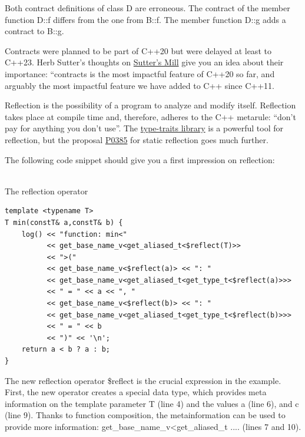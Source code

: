 Both contract definitions of class D are erroneous. The contract of the member function D::f differs from the one from B::f. The member function D::g adds a contract to B::g.

\begin{tcolorbox}[colback=blue!5!white,colframe=blue!75!black,title={Closing Thoughts from Herb Sutter}]
Contracts were planned to be part of C++20 but were delayed at least to C++23. Herb Sutter’s thoughts on \href{https://herbsutter.com/2018/07/02/trip-report-summer-iso-c-standards-meeting-rapperswil/}{Sutter’s Mill} give you an idea about their importance: “contracts is the most impactful feature of C++20 so far, and arguably the most impactful feature we have added to C++ since C++11.
\end{tcolorbox}


Reflection is the possibility of a program to analyze and modify itself. Reflection takes place at compile time and, therefore, adheres to the C++ metarule: “don’t pay for anything you don’t use”. The \href{https://en.cppreference.com/w/cpp/header/type_traits}{type-traits library} is a powerful tool for reflection, but the proposal \href{http://www.open-std.org/jtc1/sc22/wg21/docs/papers/2017/p0385r2.pdf}{P0385} for static reflection goes much further.

The following code snippet should give you a first impression on reflection:

\hspace*{\fill} \\ %
\noindent
The reflection operator
\begin{lstlisting}[style=styleCXX]
template <typename T>
T min(constT& a,constT& b) {
	log() << "function: min<"
		  << get_base_name_v<get_aliased_t<$reflect(T)>>
		  << ">("
		  << get_base_name_v<$reflect(a)> << ": "
		  << get_base_name_v<get_aliased_t<get_type_t<$reflect(a)>>>
		  << " = " << a << ", "
		  << get_base_name_v<$reflect(b)> << ": "
		  << get_base_name_v<get_aliased_t<get_type_t<$reflect(b)>>>
		  << " = " << b
		  << ")" << '\n';
	return a < b ? a : b;
}
\end{lstlisting}

The new reflection operator \$reflect is the crucial expression in the example. First, the new operator creates a special data type, which provides meta information on the template parameter T (line 4) and the values a (line 6), and c (line 9). Thanks to function composition, the metainformation can be used to provide more information: get\_base\_name\_v<get\_aliased\_t .... (lines 7 and 10).

